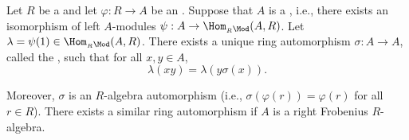 \begin{theorem} \label{theorem:nakayama_automorphism_exists_for_a_frobenius_algebra_over_a_ring}
    Let $R$ be a  and let $\varphi: R \to A$ be an . Suppose that $A$ is a , i.e., there exists an isomorphism of left $A$-modules $\psi: A \to \Hom_{{}_R\Mod}(A,R)$. Let $\lambda = \psi(1) \in \Hom_{{}_R\Mod}(A,R)$. There exists a unique ring automorphism $\sigma: A \to A$, called the , such that for all $x,y \in A$,
    $$\lambda(xy) = \lambda(y\sigma(x)).$$

    Moreover, $\sigma$ is an $R$-algebra automorphism (i.e., $\sigma(\varphi(r)) = \varphi(r)$ for all $r \in R$). There exists a similar ring automorphism if $A$ is a right Frobenius $R$-algebra.
\end{theorem}
